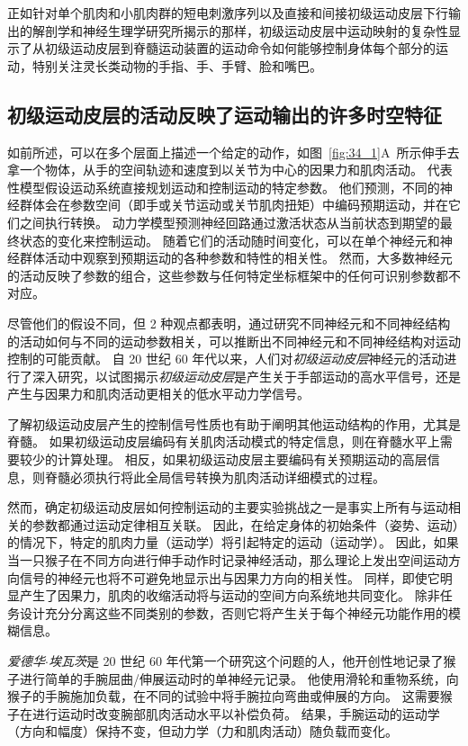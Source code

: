 正如针对单个肌肉和小肌肉群的短电刺激序列以及直接和间接初级运动皮层下行输出的解剖学和神经生理学研究所揭示的那样，初级运动皮层中运动映射的复杂性显示了从初级运动皮层到脊髓运动装置的运动命令如何能够控制身体每个部分的运动，特别关注灵长类动物的手指、手、手臂、脸和嘴巴。



\subsection{初级运动皮层的活动反映了运动输出的许多时空特征}

如前所述，可以在多个层面上描述一个给定的动作，如图~\ref{fig:34_1}A~所示伸手去拿一个物体，从手的空间轨迹和速度到以关节为中心的因果力和肌肉活动。
代表性模型假设运动系统直接规划运动和控制运动的特定参数。
他们预测，不同的神经群体会在参数空间（即手或关节运动或关节肌肉扭矩）中编码预期运动，并在它们之间执行转换。
动力学模型预测神经回路通过激活状态从当前状态到期望的最终状态的变化来控制运动。
随着它们的活动随时间变化，可以在单个神经元和神经群体活动中观察到预期运动的各种参数和特性的相关性。
然而，大多数神经元的活动反映了参数的组合，这些参数与任何特定坐标框架中的任何可识别参数都不对应。


尽管他们的假设不同，但 2 种观点都表明，通过研究不同神经元和不同神经结构的活动如何与不同的运动参数相关，可以推断出不同神经元和不同神经结构对运动控制的可能贡献。
自 20 世纪 60 年代以来，人们对\textit{初级运动皮层}神经元的活动进行了深入研究，以试图揭示\textit{初级运动皮层}是产生关于手部运动的高水平信号，还是产生与因果力和肌肉活动更相关的低水平动力学信号。


了解初级运动皮层产生的控制信号性质也有助于阐明其他运动结构的作用，尤其是脊髓。
如果初级运动皮层编码有关肌肉活动模式的特定信息，则在脊髓水平上需要较少的计算处理。
相反，如果初级运动皮层主要编码有关预期运动的高层信息，则脊髓必须执行将此全局信号转换为肌肉活动详细模式的过程。


然而，确定初级运动皮层如何控制运动的主要实验挑战之一是事实上所有与运动相关的参数都通过运动定律相互关联。
因此，在给定身体的初始条件（姿势、运动）的情况下，特定的肌肉力量（运动学）将引起特定的运动（运动学）。
因此，如果当一只猴子在不同方向进行伸手动作时记录神经活动，那么理论上发出空间运动方向信号的神经元也将不可避免地显示出与因果力方向的相关性。
同样，即使它明显产生了因果力，肌肉的收缩活动将与运动的空间方向系统地共同变化。
除非任务设计充分分离这些不同类别的参数，否则它将产生关于每个神经元功能作用的模糊信息。


\textit{爱德华$\cdot$埃瓦茨}是 20 世纪 60 年代第一个研究这个问题的人，他开创性地记录了猴子进行简单的手腕屈曲/伸展运动时的单神经元记录。
他使用滑轮和重物系统，向猴子的手腕施加负载，在不同的试验中将手腕拉向弯曲或伸展的方向。
这需要猴子在进行运动时改变腕部肌肉活动水平以补偿负荷。
结果，手腕运动的运动学（方向和幅度）保持不变，但动力学（力和肌肉活动）随负载而变化。


